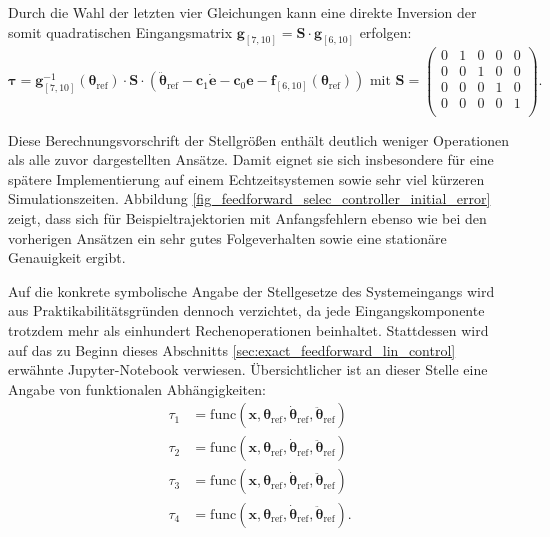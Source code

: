 Durch die Wahl der letzten vier Gleichungen kann eine direkte Inversion der somit quadratischen Eingangsmatrix $\mathbf{g}_{[7, 10]} = \mathbf{S} \cdot \mathbf{g}_{[6, 10]}$ erfolgen:
\begin{equation}
	\boldsymbol{\tau}= \mathbf{g}^{-1}_{[7, 10]}(\boldsymbol{\theta}_{\text{ref}}) \cdot \mathbf{S} \cdot (\ddot{\boldsymbol{\theta}}_{\text{ref}} - \mathbf{c}_{1} \mathbf{\dot{e}} - \mathbf{c}_{0} \mathbf{e} - \mathbf{f}_{[6, 10]}(\boldsymbol{\theta}_{\text{ref}})) \text{ mit } 
	\mathbf{S} = 
	\begin{pmatrix}
	0 & 1 & 0 & 0 & 0 \\
	0 & 0 & 1 & 0 & 0 \\
	0 & 0 & 0 & 1 & 0 \\
	0 & 0 & 0 & 0 & 1 \\
	\end{pmatrix}.
\end{equation}

Diese Berechnungsvorschrift der Stellgrößen enthält deutlich weniger Operationen als alle zuvor dargestellten Ansätze. Damit eignet sie sich insbesondere für eine spätere Implementierung auf einem Echtzeitsystemen sowie sehr viel kürzeren Simulationszeiten. Abbildung \ref{fig_feedforward_selec_controller_initial_error} zeigt, dass sich für Beispieltrajektorien mit Anfangsfehlern ebenso wie bei den vorherigen Ansätzen ein sehr gutes Folgeverhalten sowie eine stationäre Genauigkeit ergibt.

Auf die konkrete symbolische Angabe der Stellgesetze des Systemeingangs wird aus Praktikabilitätsgründen dennoch verzichtet, da jede Eingangskomponente trotzdem mehr als einhundert Rechenoperationen beinhaltet. Stattdessen wird auf das zu Beginn dieses Abschnitts \ref{sec:exact_feedforward_lin_control} erwähnte Jupyter-Notebook verwiesen. Übersichtlicher ist an dieser Stelle eine Angabe von funktionalen Abhängigkeiten:
\begin{subequations}
	\begin{align}
		\tau_1 &= \mathrm{func}(\mathbf{x}, \boldsymbol{\theta}_{\mathrm{ref}}, \dot{\boldsymbol{\theta}}_{\mathrm{ref}}, \ddot{\boldsymbol{\theta}}_{\mathrm{ref}}) \\
		\tau_2 &= \mathrm{func}(\mathbf{x}, \boldsymbol{\theta}_{\mathrm{ref}}, \dot{\boldsymbol{\theta}}_{\mathrm{ref}}, \ddot{\boldsymbol{\theta}}_{\mathrm{ref}}) \\
		\tau_3 &= \mathrm{func}(\mathbf{x}, \boldsymbol{\theta}_{\mathrm{ref}}, \dot{\boldsymbol{\theta}}_{\mathrm{ref}}, \ddot{\boldsymbol{\theta}}_{\mathrm{ref}}) \\
		\tau_4 &= \mathrm{func}(\mathbf{x}, \boldsymbol{\theta}_{\mathrm{ref}}, \dot{\boldsymbol{\theta}}_{\mathrm{ref}}, \ddot{\boldsymbol{\theta}}_{\mathrm{ref}}).
	\end{align}
\end{subequations}


